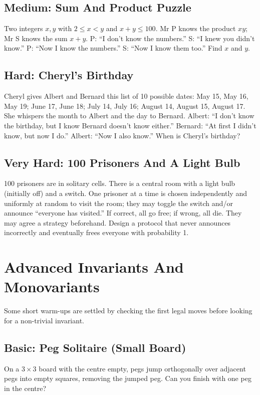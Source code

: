 \documentclass[12pt]{article}
\begin{document}
\subsection*{Medium: Sum And Product Puzzle}
Two integers $x,y$ with $2 \le x < y$ and $x+y \le 100$. Mr P knows
the product $xy$; Mr S knows the sum $x+y$.
P: ``I don't know the numbers.''
S: ``I knew you didn't know.''
P: ``Now I know the numbers.''
S: ``Now I know them too.''
Find $x$ and $y$.

\subsection*{Hard: Cheryl's Birthday}
Cheryl gives Albert and Bernard this list of 10 possible dates:
May 15, May 16, May 19; June 17, June 18; July 14, July 16;
August 14, August 15, August 17. She whispers the month to Albert
and the day to Bernard.
Albert: ``I don't know the birthday, but I know Bernard doesn't know either.''
Bernard: ``At first I didn't know, but now I do.''
Albert: ``Now I also know.''
When is Cheryl's birthday?

\subsection*{Very Hard: 100 Prisoners And A Light Bulb}
100 prisoners are in solitary cells. There is a central room with a
light bulb (initially off) and a switch. One prisoner at a time is
chosen independently and uniformly at random to visit the room;
they may toggle the switch and/or
announce ``everyone has visited.'' If correct, all go free; if wrong,
all die. They may agree a strategy beforehand. Design a protocol that
never announces incorrectly and eventually frees everyone with
probability 1.

\section{Advanced Invariants And Monovariants}
Some short warm-ups are settled by checking the first legal moves before
looking for a non-trivial invariant.

\subsection*{Basic: Peg Solitaire (Small Board)}
On a $3\times3$ board with the centre empty, pegs jump orthogonally
over adjacent pegs into empty squares, removing the jumped peg. Can
you finish with one peg in the centre?
\end{document}

